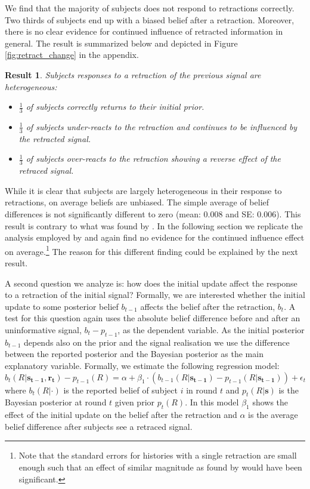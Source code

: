 \documentclass{article}
\newtheorem{result}{Result}
\newenvironment{Result}{\begin{result} \rm }{\end{result}}
\begin{document}
We find that the majority of subjects does not respond to retractions correctly. Two thirds of subjects end up with a biased belief after a retraction. Moreover, there is no clear evidence for continued influence of retracted information in general. The result is summarized below and depicted in Figure \ref{fig:retract_change} in the appendix.

\begin{Result}
    Subjects responses to a retraction of the previous signal are heterogeneous:
    \begin{itemize}
        \item $\frac{1}{3}$ of subjects correctly returns to their initial prior.
        \item $\frac{1}{3}$ of subjects under-reacts to the retraction and continues to be influenced by the retracted signal.
        \item $\frac{1}{3}$ of subjects over-reacts to the retraction showing a reverse effect of the retraced signal.
    \end{itemize} 
\end{Result}

While it is clear that subjects are largely heterogeneous in their response to retractions, on average beliefs are unbiased. The simple average of belief differences is not significantly different to zero (mean: 0.008 and SE: 0.006). This result is contrary to what was found by \cite{Goncalves2022}. In the following section we replicate the analysis employed by \cite{Goncalves2022} and again find no evidence for the continued influence effect on average.\footnote{Note that the standard errors for histories with a single retraction are small enough such that an effect of similar magnitude as found by \cite{Goncalves2022} would have been significant.} The reason for this different finding could be explained by the next result.

A second question we analyze is: how does the initial update affect the response to a retraction of the initial signal? Formally, we are interested whether the initial update to some posterior belief $b_{t-1}$ affects the belief after the retraction, $b_t$. A test for this question again uses the absolute belief difference before and after an uninformative signal, $b_t-p_{t-1}$, as the dependent variable. As the initial posterior $b_{t-1}$ depends also on the prior and the signal realisation we use the difference between the reported posterior and the Bayesian posterior as the main explanatory variable. Formally, we estimate the following regression model:
\begin{equation}
\label{reg:retraction_simple}
    b_t(R|\mathbf{s_{t-1}}, \mathbf{r_t})-p_{t-1}(R)=\alpha + \beta_1 \cdot (b_{t-1}(R|\mathbf{s_{t-1}})-p_{t-1}(R|\mathbf{s_{t-1}}))+\epsilon_t
\end{equation}
where $b_t(R|\cdot)$ is the reported belief of subject $i$ in round $t$ and $p_t(R|\mathbf{s})$ is the Bayesian posterior at round $t$ given prior $p_t(R)$. In this model $\beta_1$ shows the effect of the initial update on the belief after the retraction and $\alpha$ is the average belief difference after subjects see a retraced signal. 
\end{document}

